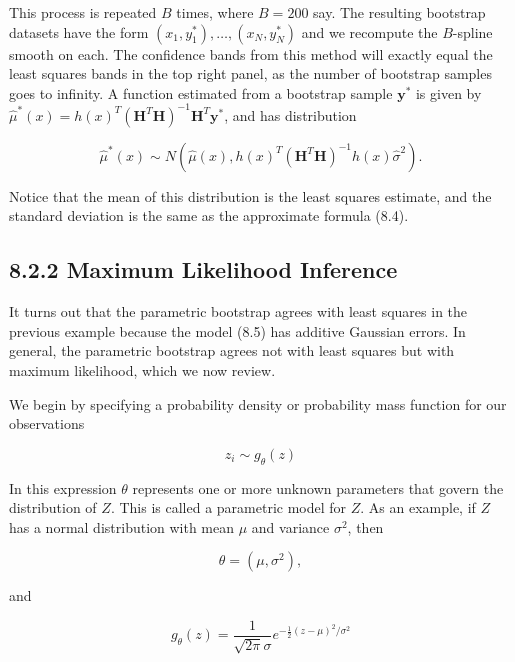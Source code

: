 \documentclass[10pt]{article}
\begin{document}
This process is repeated $B$ times, where $B=200$ say. The resulting bootstrap datasets have the form $\left(x_{1}, y_{1}^{*}\right), \ldots,\left(x_{N}, y_{N}^{*}\right)$ and we recompute the $B$-spline smooth on each. The confidence bands from this method will exactly equal the least squares bands in the top right panel, as the number of bootstrap samples goes to infinity. A function estimated from a bootstrap sample $\mathbf{y}^{*}$ is given by $\hat{\mu}^{*}(x)=h(x)^{T}\left(\mathbf{H}^{T} \mathbf{H}\right)^{-1} \mathbf{H}^{T} \mathbf{y}^{*}$, and has distribution


\begin{equation*}
\hat{\mu}^{*}(x) \sim N\left(\hat{\mu}(x), h(x)^{T}\left(\mathbf{H}^{T} \mathbf{H}\right)^{-1} h(x) \hat{\sigma}^{2}\right) . \tag{8.7}
\end{equation*}


Notice that the mean of this distribution is the least squares estimate, and the standard deviation is the same as the approximate formula (8.4).

\subsection*{8.2.2 Maximum Likelihood Inference}
It turns out that the parametric bootstrap agrees with least squares in the previous example because the model (8.5) has additive Gaussian errors. In general, the parametric bootstrap agrees not with least squares but with maximum likelihood, which we now review.

We begin by specifying a probability density or probability mass function for our observations


\begin{equation*}
z_{i} \sim g_{\theta}(z) \tag{8.8}
\end{equation*}


In this expression $\theta$ represents one or more unknown parameters that govern the distribution of $Z$. This is called a parametric model for $Z$. As an example, if $Z$ has a normal distribution with mean $\mu$ and variance $\sigma^{2}$, then


\begin{equation*}
\theta=\left(\mu, \sigma^{2}\right), \tag{8.9}
\end{equation*}


and


\begin{equation*}
g_{\theta}(z)=\frac{1}{\sqrt{2 \pi} \sigma} e^{-\frac{1}{2}(z-\mu)^{2} / \sigma^{2}} \tag{8.10}
\end{equation*}
\end{document}

